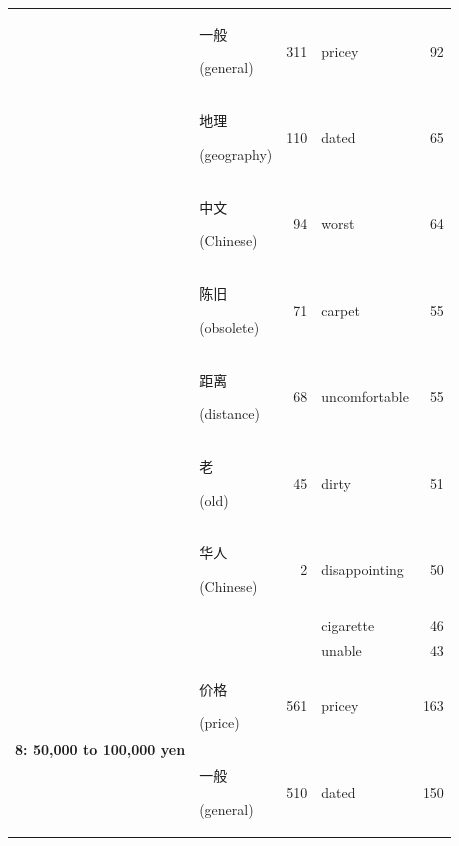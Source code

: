 \documentclass[smallextended,natbib]{svjour3}       %
\begin{document}
\begin{table}[ht]
{\begin{tabular}{|c|lr|lr|}
                                                             & \begin{CJK}{UTF8}{gbsn}一般\end{CJK} (general)   & 311  & pricey         & 92  \\  
                                                             & \begin{CJK}{UTF8}{gbsn}地理\end{CJK} (geography) & 110  & dated          & 65  \\  
                                                             & \begin{CJK}{UTF8}{gbsn}中文\end{CJK} (Chinese)   & 94   & worst          & 64  \\  
                                                             & \begin{CJK}{UTF8}{gbsn}陈旧\end{CJK} (obsolete)  & 71   & carpet         & 55  \\  
                                                             & \begin{CJK}{UTF8}{gbsn}距离\end{CJK} (distance)  & 68   & uncomfortable  & 55  \\  
                                                             & \begin{CJK}{UTF8}{gbsn}老\end{CJK} (old)        & 45   & dirty          & 51  \\  
                                                             & \begin{CJK}{UTF8}{gbsn}华人\end{CJK} (Chinese)   & 2    & disappointing  & 50  \\  
                                                             &                                                &      & cigarette      & 46  \\  
                                                             &                                                &      & unable         & 43  \\ \hline
        \multirow{10}{*}{\textbf{8: 50,000 to 100,000 yen}} &
                                                               \begin{CJK}{UTF8}{gbsn}价格\end{CJK} (price)     & 561  & pricey         & 163 \\ 
                                                             & \begin{CJK}{UTF8}{gbsn}一般\end{CJK} (general)   & 510  & dated          & 150 \\  

\end{tabular}}
\end{table}
\end{document}

